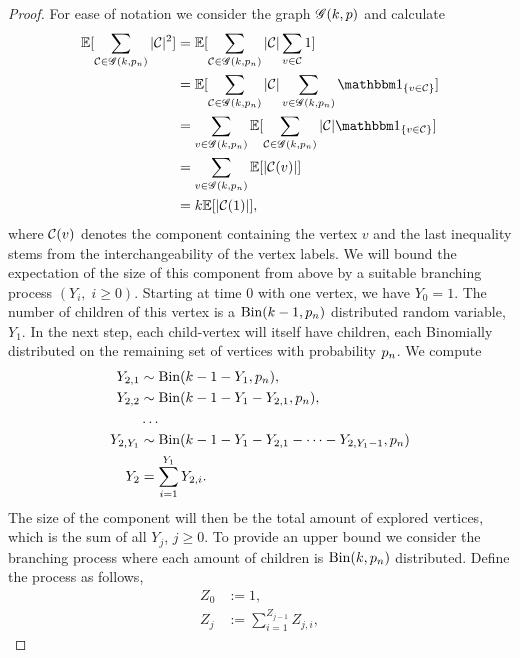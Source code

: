 \begin{proof}
	For ease of notation we consider the graph $\mathscr{G}(k,p)$ and calculate
	\begin{equation} \label{E: P(ExcEvent) 3}
	\begin{aligned}
	\Exp{\sum_{\Ccal \in \Gcal(k, \p)} |\Ccal|^2 } 
	&= \Exp{ \sum_{\Ccal \in \Gcal(k, \p)} |\Ccal| \sum_{v \in \Ccal} 1} \\
	&= \Exp{ \sum_{\Ccal \in \Gcal(k, \p)} |\Ccal| \sum_{v \in \Gcal(k, \p)} \Ind{\{v \in \Ccal\}} } \\
	&= \sum_{v \in \Gcal(k, \p)} \Exp{ \sum_{\Ccal \in \Gcal(k, \p)} |\Ccal| \Ind{\{v \in \Ccal\}} } \\ 
	&= \sum_{v \in \Gcal(k, \p)} \Exp{|\Ccal(v)|} \\
	&= k \Exp{|\Ccal(1)|},
	\end{aligned}
	\end{equation}
	where $\mathcal{C}(v)$ denotes the component containing the vertex $v$ and the last inequality stems from the interchangeability of the vertex labels.
	We will bound the expectation of the size of this component from above by a suitable branching process $(Y_i, \; i\geq 0)$.
	Starting at time $0$ with one vertex, we have $Y_0 = 1$.
	The number of children of this vertex is a $\operatorname*{Bin}(k-1, p_n)$ distributed random variable, $Y_1$.
	In the next step, each child-vertex will itself have children,
	each Binomially distributed on the remaining set of vertices with probability $ p_n$.
	We compute 
	\begin{equation}
	\begin{aligned}
	Y_{2,1} &\sim \operatorname*{Bin}(k-1-Y_1, p_n), \\ 
	Y_{2,2} &\sim \operatorname*{Bin}(k-1-Y_1-Y_{2,1}, p_n), \\
	&\dots \\
	Y_{2,Y_1} &\sim \operatorname*{Bin}(k-1-Y_1-Y_{2,1}-\dots-Y_{2,Y_1-1}, p_n) \\
	Y_2 &= \sum_{i=1}^{Y_1} Y_{2,i}.
	\end{aligned}
	\end{equation}
	The size of the component will then be the total amount of explored vertices,
	which is the sum of all $Y_j$, $j \geq 0$.
	To provide an upper bound we consider the branching process where each amount of children is $\operatorname*{Bin}(k, p_n)$ distributed.
	Define the process as follows,
	\begin{equation}
	\begin{aligned}
	Z_0 &:= 1, \\
	Z_j &:= \sum_{i=1}^{Z_{j-1}} Z_{j,i},
	\end{aligned}
	\end{equation}

\end{proof}
